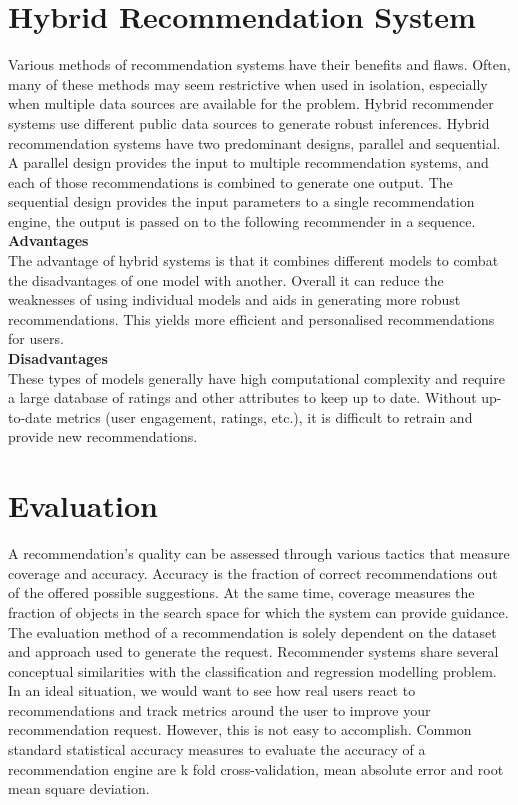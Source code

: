 \section{Hybrid Recommendation System}
Various methods of recommendation systems have their benefits and flaws. Often, many of these methods may seem restrictive when used in isolation, especially when multiple data sources are available for the problem. Hybrid recommender systems use different public data sources to generate robust inferences. Hybrid recommendation systems have two predominant designs, parallel and sequential. A parallel design provides the input to multiple recommendation systems, and each of those recommendations is combined to generate one output. 
The sequential design provides the input parameters to a single recommendation engine, the output is passed on to the following recommender in a sequence.
\\\textbf{Advantages}
\\The advantage of hybrid systems is that it combines different models to combat the disadvantages of one model with another. Overall it can reduce the weaknesses of using individual models and aids in generating more robust recommendations. This yields more efficient and personalised recommendations for users.
\\\textbf{Disadvantages} 
\\These types of models generally have high computational complexity and require a large database of ratings and other attributes to keep up to date. Without up-to-date metrics (user engagement, ratings, etc.), it is difficult to retrain and provide new recommendations.

\section{Evaluation}
A recommendation's quality can be assessed through various tactics that measure coverage and accuracy. Accuracy is the fraction of correct recommendations out of the offered possible suggestions. At the same time, coverage measures the fraction of objects in the search space for which the system can provide guidance. 
The evaluation method of a recommendation is solely dependent on the dataset and approach used to generate the request. 
Recommender systems share several conceptual similarities with the classification and regression modelling problem. 
In an ideal situation, we would want to see how real users react to recommendations and track metrics around the user to improve your recommendation request. However, this is not easy to accomplish. 
Common standard statistical accuracy measures to evaluate the accuracy of a recommendation engine are k fold cross-validation, mean absolute error and root mean square deviation. 
